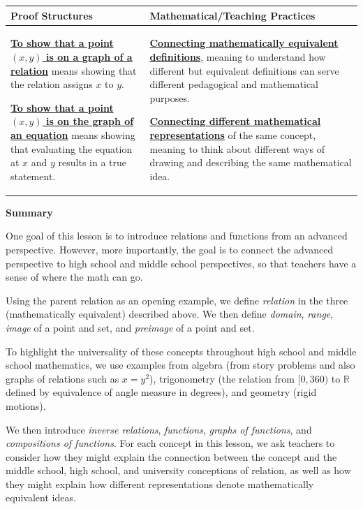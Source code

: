 \documentclass[11pt]{article}
\newcommand\header[1]{\vspace*{4pt}\par {\large {\bf #1}}\par}
\newcommand{\R}{\mathbb{R}}
\renewcommand\emph[1]{\underline{\bf{#1}}} %
\theoremstyle{definition}
\begin{document}
\begin{tabular}{L{3.2in}|L{3.2in}}
{\bf Proof Structures} & {\bf Mathematical/Teaching Practices} \\ 
\hline \parskip4pt
\emph{To show that a point $(x,y)$ is on a graph of a relation} means showing that the relation assigns $x$ to $y$.

\emph{To show that a point $(x,y)$ is on the graph of an equation} means showing that evaluating the equation at $x$ and $y$ results in a true statement.
&
\parskip6pt
\emph{Connecting mathematically equivalent definitions}, meaning to understand how different but equivalent definitions can serve different pedagogical and mathematical purposes. 

\emph{Connecting different mathematical representations} of the same concept, meaning to think about different ways of drawing and describing the same mathematical idea. 
\end{tabular}

\header{Summary}

One goal of this lesson is to introduce relations and functions from an advanced perspective. However, more importantly, the goal is to connect the advanced perspective to high school and middle school perspectives, so that teachers have a sense of where the math can go.

Using the parent relation as an opening example, we define {\it relation} in the three (mathematically equivalent) described above. We then define {\it domain}, {\it range}, {\it image} of a point and set, and {\it preimage} of a point and set. 

To highlight the universality of these concepts throughout high school and middle school mathematics, we use examples from algebra (from story problems and also graphs of relations such as $x=y^2$), trigonometry (the relation from $[0,360)$ to $\R$ defined by equivalence of angle measure in degrees), and geometry (rigid motions).

We then introduce {\it inverse relations}, {\it functions}, {\it graphs of functions}, and {\it compositions of functions}.  For each concept in this lesson, we ask teachers to consider how they might explain the connection between the concept and the middle school, high school, and university conceptions of relation, as well as how they might explain how different representations denote mathematically equivalent ideas.
\end{document}

